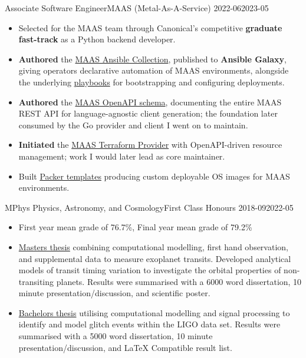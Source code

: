 {Associate Software Engineer}{MAAS (Metal-As-A-Service)}
{2022-06}{2023-05}
{%
\begin{itemize}[leftmargin=*, labelsep=-0.1em, noitemsep]
    \item Selected for the MAAS team through Canonical's competitive \textbf{graduate fast-track} as a Python backend developer.
    \item \textbf{Authored} the \href{https://github.com/canonical/ansible-collection}{MAAS Ansible Collection}, published to \textbf{Ansible Galaxy}, giving operators declarative automation of MAAS environments, alongside the underlying \href{https://github.com/maas/MAAS-ansible-playbook}{playbooks} for bootstrapping and configuring deployments.
    \item \textbf{Authored} the \href{https://maas.io/docs/api}{MAAS OpenAPI schema}, documenting the entire MAAS REST API for language-agnostic client generation; the foundation later consumed by the Go provider and client I went on to maintain.
    \item \textbf{Initiated} the \href{https://github.com/canonical/terraform-provider-maas}{MAAS Terraform Provider} with OpenAPI-driven resource management; work I would later lead as core maintainer.
    \item Built \href{https://github.com/canonical/packer-maas}{Packer templates} producing custom deployable OS images for MAAS environments.
\end{itemize}
}


{MPhys Physics, Astronomy, and Cosmology}{First Class Honours}
{2018-09}{2022-05}
{%
\begin{itemize}[leftmargin=*, labelsep=-0.1em, noitemsep]
    \item First year mean grade of 76.7\%, Final year mean grade of 79.2\%
    \item \href{https://skyecas.github.io/assets/pdf/TransitDissertation.pdf}{Masters thesis} combining computational modelling, first hand observation, and supplemental data to measure exoplanet transits. Developed analytical models of transit timing variation to investigate the orbital properties of non-transiting planets. Results were summarised with a 6000 word dissertation, 10 minute presentation/discussion, and scientific poster.
    \item \href{https://skyecas.github.io/assets/pdf/GWProjectFinalReport.pdf}{Bachelors thesis} utilising computational modelling and signal processing to identify and model glitch events within the LIGO data set. Results were summarised with a 5000 word dissertation, 10 minute presentation/discussion, and LaTeX Compatible result list.
\end{itemize}
}

